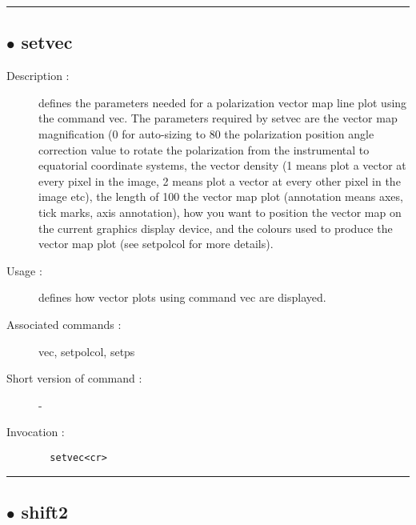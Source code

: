 \hrule \subsection*{$\bullet$ setvec}
\begin{description}
\item[Description :] defines the parameters needed for a polarization vector map line
plot using the command vec.  The parameters required by setvec are the
vector map magnification (0 for auto-sizing to 80%
the polarization position angle correction value to rotate the
polarization from the instrumental to equatorial coordinate systems, the
vector density (1 means plot a vector at every pixel in the image, 2
means plot a vector at every other pixel in the image etc), the length of
100%
the vector map plot (annotation means axes, tick marks, axis annotation),
how you want to position the vector map on the current graphics display
device, and the colours used to produce the vector map plot (see
setpolcol for more details).
\item[Usage :] defines how vector plots using command vec are displayed.
\item[Associated commands :] vec, setpolcol, setps
\item[Short version of command :] -
\item[Invocation :]

\verb+  setvec<cr> +\end{description}

\hrule \subsection*{$\bullet$ shift2}

